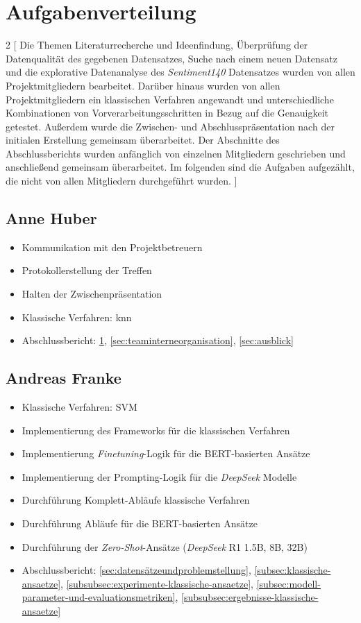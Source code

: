 \section{Aufgabenverteilung}\label{sec:aufgabenverteilung}

\begin{multicols}{2}
[
Die Themen Literaturrecherche und Ideenfindung, Überprüfung der Datenqualität des gegebenen Datensatzes, Suche nach einem neuen Datensatz und die explorative Datenanalyse des \textit{Sentiment140} Datensatzes wurden von allen Projektmitgliedern bearbeitet.
Darüber hinaus wurden von allen Projektmitgliedern ein klassischen Verfahren angewandt und unterschiedliche Kombinationen von Vorverarbeitungsschritten in Bezug auf die Genauigkeit getestet.
Außerdem wurde die Zwischen- und Abschlusspräsentation nach der initialen Erstellung gemeinsam überarbeitet.
Der Abschnitte des Abschlussberichts wurden anfänglich von einzelnen Mitgliedern geschrieben und anschließend gemeinsam überarbeitet.
Im folgenden sind die Aufgaben aufgezählt, die nicht von allen Mitgliedern durchgeführt wurden.
]

\subsection{Anne Huber}
\begin{itemize}
    \item Kommunikation mit den Projektbetreuern
    \item Protokollerstellung der Treffen
    \item Halten der Zwischenpräsentation
    \item Klassische Verfahren: \gls{knn}
    \item Abschlussbericht: \ref{sec:aufgabenverteilung}, \ref{sec:teaminterneorganisation}, \ref{sec:ausblick}
\end{itemize}


\subsection{Andreas Franke}
\begin{itemize}
    \item Klassische Verfahren: SVM
    \item Implementierung des Frameworks für die klassischen Verfahren
    \item Implementierung \textit{Finetuning}-Logik für die BERT-basierten Ansätze
    \item Implementierung der Prompting-Logik für die \textit{DeepSeek} Modelle
    \item Durchführung Komplett-Abläufe klassische Verfahren
    \item Durchführung Abläufe für die BERT-basierten Ansätze
    \item Durchführung der \textit{Zero-Shot}-Ansätze (\textit{DeepSeek} R1 1.5B, 8B, 32B)
    \item Abschlussbericht: \ref{sec:datensätzeundproblemstellung}, \ref{subsec:klassische-ansaetze}, \ref{subsubsec:experimente-klassische-ansaetze}, \ref{subsec:modell-parameter-und-evaluationsmetriken}, \ref{subsubsec:ergebnisse-klassische-ansaetze}
\end{itemize}


\end{multicols}

